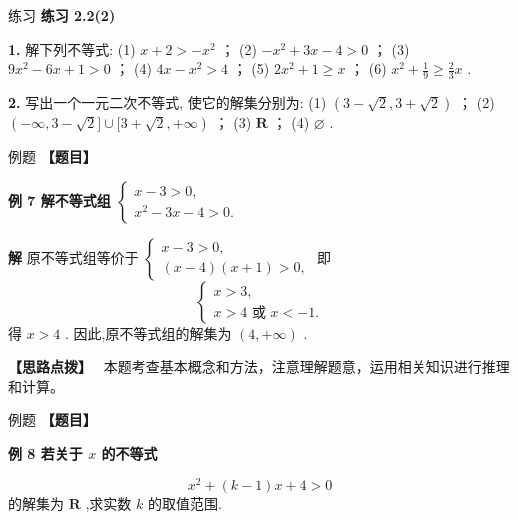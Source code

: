 \documentclass[a4paper,10pt,oneside,fontset=none]{ctexbook}
\renewcommand{\geq}{\geqslant}
\newcounter{example}[chapter]
\newenvironment{example}[1][]{\begin{exBox}{例题}{#1}}{\end{exBox}}
\newenvironment{exercise}[1][]{\begin{exBox}{练习}{#1}}{\end{exBox}}
\numberwithin{equation}{chapter}
\newenvironment{solution}{\begin{solutionBox}}{\end{solutionBox}}
\newenvironment{hint}{\begin{hintBox}\textbf{【思路点拨】}~}{\end{hintBox}}
\begin{document}
\begin{exercise}
\textbf{练习 2.2(2)}\par\vspace{0.5em}
\textbf{1.} 解下列不等式: (1) $x + 2 >  - {x}^{2}$ ； (2) $- {x}^{2} + {3x} - 4 > 0$ ； (3) $9{x}^{2} - {6x} + 1 > 0$ ； (4) ${4x} - {x}^{2} > 4$ ； (5) $2{x}^{2} + 1 \geq  x$ ； (6) ${x}^{2} + \frac{1}{9} \geq  \frac{2}{3}x$ .
\par\vspace{0.8em}
\textbf{2.} 写出一个一元二次不等式, 使它的解集分别为: (1) $\left( {3 - \sqrt{2},3 + \sqrt{2}}\right)$ ； (2) $\left( {-\infty ,3 - \sqrt{2}\rbrack \cup \lbrack 3 + \sqrt{2}, + \infty }\right)$ ； (3) $\mathbf{R}$ ； (4) $\varnothing$ .
\end{exercise}

\begin{example}
\textbf{【题目】}\par\vspace{0.3em}
\textbf{例 7 解不等式组 $\left\{  \begin{array}{l} x - 3 > 0, \\  {x}^{2} - {3x} - 4 > 0. \end{array}\right.$}\par\vspace{0.3em}
\end{example}

\begin{solution}
\textbf{解}
原不等式组等价于 $\left\{  \begin{array}{l} x - 3 > 0, \\  \left( {x - 4}\right) \left( {x + 1}\right)  > 0, \end{array}\right.$ 即
$$
\left\{  \begin{array}{l} x > 3, \\  x > 4\text{ 或 }x <  - 1. \end{array}\right.
$$
得 $x > 4$ .
因此,原不等式组的解集为 $\left( {4, + \infty }\right)$ .
\end{solution}

\begin{hint}
本题考查基本概念和方法，注意理解题意，运用相关知识进行推理和计算。
\end{hint}

\begin{example}
\textbf{【题目】}\par\vspace{0.3em}
\textbf{例 8 若关于 $x$ 的不等式}\par\vspace{0.3em}
$$
{x}^{2} + \left( {k - 1}\right) x + 4 > 0
$$
的解集为 $\mathbf{R}$ ,求实数 $k$ 的取值范围.
\end{example}
\end{document}
